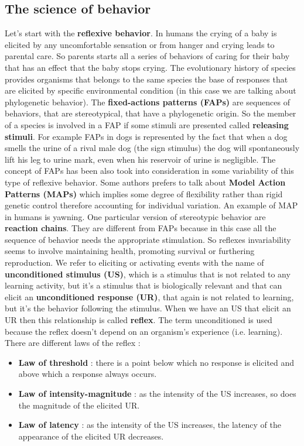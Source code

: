 \documentclass[11pt]{article}
\begin{document}
\subsection{The science of behavior}
Let's start with the \textbf{reflexive behavior}. In humans the crying of a baby is elicited by any uncomfortable sensation or from hanger and crying leads to parental care. So parents starts all a series of behaviors of caring for their baby that has an effect that the baby stops crying. The evolutionary history of species provides organisms that belongs to the same species the base of responses that are elicited by specific environmental condition (in this case we are talking about phylogenetic behavior). The \textbf{fixed-actions patterns (FAPs)} are sequences of behaviors, that are stereotypical, that have a phylogenetic origin. So the member of a species is involved in a FAP if some stimuli are presented called \textbf{releasing stimuli}. For example FAPs in dogs is represented by the fact that when a dog smells the urine of a rival male dog (the sign stimulus) the dog will spontaneously lift his leg to urine mark, even when his reservoir of urine is negligible. The concept of FAPs has been also took into consideration in some variability of this type of reflexive behavior. Some authors prefers to talk about \textbf{Model Action Patterns (MAPs)} which implies some degree of flexibility rather than rigid genetic control therefore accounting for individual variation. An example of MAP in humans is yawning. One particular version of stereotypic behavior are \textbf{reaction chains}. They are different from FAPs because in this case all the sequence of behavior needs the appropriate stimulation. So reflexes invariability seems to involve maintaining health, promoting survival or furthering reproduction. We refer to eliciting or activating events with the name of \textbf{unconditioned stimulus (US)}, which is a stimulus that is not related to any learning activity, but it's a stimulus that is biologically relevant and that can elicit an \textbf{unconditioned response (UR)}, that again is not related to learning, but it's the behavior following the stimulus. When we have an US that elicit an UR then this relationship is called \textbf{reflex}. The term unconditioned is used because the reflex doesn't depend on an organism's experience (i.e. learning). There are different laws of the reflex : 
\begin{itemize}
\item \textbf{Law of threshold} : there is a point below which no response is elicited and above which a response always occurs.

\item \textbf{Law of intensity-magnitude} : as the intensity of the US increases, so does the magnitude of the elicited UR.

\item \textbf{Law of latency} : as the intensity of the US increases, the latency of the appearance of the elicited UR decreases.
\end{itemize}
\end{document}
